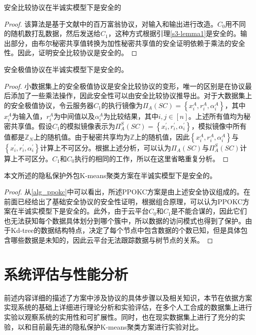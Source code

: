 \begin{theorem}
	安全比较协议在半诚实模型下是安全的
\end{theorem}
\begin{proof}
	该算法是基于文献\cite{rathee2020cryptflow2}中的百万富翁协议，对输入和输出进行改造。$ C_0 $用不同的随机数打乱数据，然后发送给$ C_1 $，这种方式根据引理\ref{s3-lemma1}是安全的。输出部分，由布尔秘密共享值转换为加性秘密共享值的安全证明依赖于乘法的安全性。因此，证明安全比较协议是安全的。
\end{proof}
\begin{theorem}
	安全极值协议在半诚实模型下是安全的。
\end{theorem}
\begin{proof}
	小数据集上的安全极值协议是安全比较协议的变形，唯一的区别是在协议最后添加了一些乘法操作，因此安全性可以由安全比较协议推导出。对于大数据集上的安全极值协议，令云服务器$ C_1 $的执行镜像为$\Pi_A(S C)=\left\{x_i^A, r_i^A, \alpha_i^A\right\}$，其中$ x_i^A $为输入值，$ r_i^A $为中间值以及$ \alpha_i^A $为比较结果，其中$ i,j\in[n] $。上述所有值均为秘密共享值。假设$ C_1 $的模拟镜像表示为$\Pi_A^S(S C)=\left\{x_i^{\prime}, r_i^{\prime}, \alpha_i^{\prime}\right\}$，模拟镜像中所有值都是$ \mathbb{Z}_N $上的随机值。由于秘密共享均为$ \mathbb{Z} $上的随机值，因此$ \left\{x_i^A, r_i^A, \alpha_i^A\right\} $与$ \left\{x_i^{\prime}, r_i^{\prime}, \alpha_i^{\prime}\right\} $计算上不可区分。根据上述分析，可以认为$ \Pi_A(SC) $与$ \Pi_A^S(SC) $计算上不可区分。$ C_1 $和$ C_0 $执行的相同的工作，所以在这里省略重复分析。
\end{proof}
\begin{theorem}
	本文所述的隐私保护外包K-means聚类方案在半诚实模型下是安全的。
\end{theorem}
\begin{proof}
	从\ref{alg_ppokc}中可以看出，所述PPOKC方案是由上述安全协议组成的。在前面已经给出了基础安全协议的安全性证明，根据组合原理\cite{goldreich2004encryption}，可以认为PPOKC方案在半诚实模型下是安全的。此外，由于云平台$ C_0 $和$ C_1 $是不能合谋的，因此它们也无法获知每个数据具体划分到哪个簇中，所以数据的访问模式也得到了保护。由于Kd-tree的数据结构特点，决定了每个节点中包含数据的个数已知，但是具体包含哪些数据是未知的，因此云平台无法跟踪数据与树节点的关系。
\end{proof}
\section{系统评估与性能分析}
\label{s3-shiyan}
前述内容详细的描述了方案中涉及协议的具体步骤以及相关知识，本节在依据方案实现系统的基础上详细进行理论分析和实验评估，在多个人工合成的数据集上进行实验以观察系统的实用性和可扩展性。同时，也在现实数据集上进行了充分的实验，以和目前最先进的隐私保护K-means聚类方案\cite{wu2020secure,mohassel2019practical}进行实验对比。
